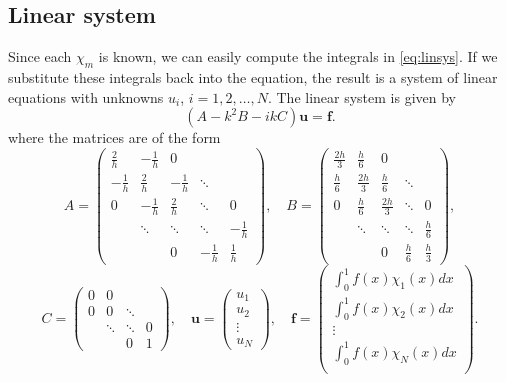 \documentclass[a4paper]{article}
\newcommand{\vct}{\mathbf}
\begin{document}
\subsection{Linear system}

Since each $\chi_m$ is known, we can easily compute the integrals in
\eqref{eq:linsys}. If we substitute these integrals back into the
equation, the result is a system of linear equations with unknowns
$u_i$, $i = 1, 2, \ldots, N$. The linear system is given by
\begin{equation}
  (A - k^2 B - i k C)\vct{u} = \vct{f}.
\end{equation}
where the matrices are of the form
\begin{equation*}
  A = \begin{pmatrix}
        \frac{2}{h} & - \frac{1}{h} & 0 & & \\
        - \frac{1}{h} & \frac{2}{h} & - \frac{1}{h} &  \ddots & \\
        0 &- \frac{1}{h} & \frac{2}{h} & \ddots & 0 \\
        & \ddots & \ddots & \ddots & - \frac{1}{h} \\
        & & 0 & - \frac{1}{h} & \frac{1}{h}
      \end{pmatrix},
  \quad
  B = \begin{pmatrix}
        \frac{2h}{3} & \frac{h}{6} & 0 & & \\
        \frac{h}{6} & \frac{2h}{3} & \frac{h}{6} &  \ddots & \\
        0 & \frac{h}{6} & \frac{2h}{3} & \ddots & 0 \\
        & \ddots & \ddots & \ddots & \frac{h}{6} \\
        & & 0 & \frac{h}{6} & \frac{h}{3}
      \end{pmatrix},
\end{equation*}
\begin{equation*}
  C = \begin{pmatrix}
        0 & 0       &         & \\
        0 & 0       & \ddots  & \\
          & \ddots  & \ddots  & 0 \\
          &         & 0       & 1
      \end{pmatrix},
  \quad
  \vct{u} = \begin{pmatrix}
              u_1 \\
              u_2 \\
              \vdots \\
              u_N
            \end{pmatrix},
  \quad
  \vct{f} = \begin{pmatrix}
              \int^1_0 f(x) \chi_1(x) dx \\
              \int^1_0 f(x) \chi_2(x) dx \\
              \vdots \\
              \int^1_0 f(x) \chi_N(x) dx \\
            \end{pmatrix}.
\end{equation*}
\end{document}
